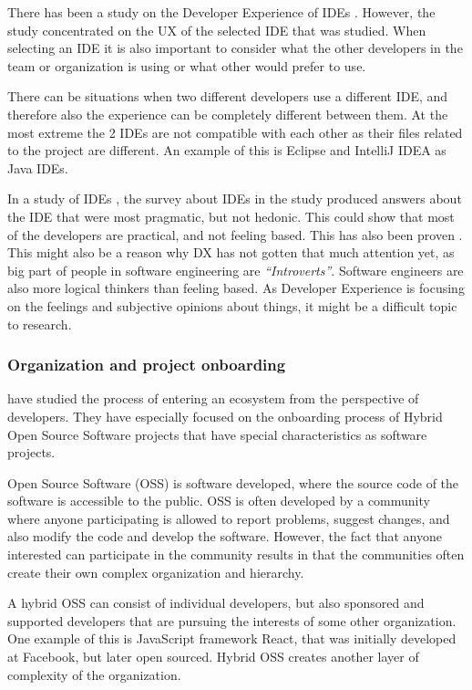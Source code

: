\documentclass[english, 12pt, a4paper, sci, utf8, a-1b, online]{aaltothesis}
\begin{document}
There has been a study on the Developer Experience of IDEs \parencite{software-developers-as-users}. However, the study concentrated on the UX of the selected IDE that was studied. When selecting an IDE it is also important to consider what the other developers in the team or organization is using or what other would prefer to use.

There can be situations when two different developers use a different IDE, and therefore also the experience can be completely different between them. At the most extreme the 2 IDEs are not compatible with each other as their files related to the project are different. An example of this is Eclipse and IntelliJ IDEA as Java IDEs.

In a study of IDEs \parencite{software-developers-as-users}, the survey about IDEs in the study produced answers about the IDE that were most pragmatic, but not hedonic. This could show that most of the developers are practical, and not feeling based. This has also been proven \parencite{personality-software}. This might also be a reason why DX has not gotten that much attention yet, as big part of people in software engineering are \textit{``Introverts''}. Software engineers are also more logical thinkers than feeling based. As Developer Experience is focusing on the feelings and subjective opinions about things, it might be a difficult topic to research.

\subsubsection{Organization and project onboarding}

\textcite{entering-an-ecosystem} have studied the process of entering an ecosystem from the perspective of developers. They have especially focused on the onboarding process of Hybrid Open Source Software projects that have special characteristics as software projects.

Open Source Software (OSS) is software developed, where the source code of the software is accessible to the public. OSS is often developed by a community where anyone participating is allowed to report problems, suggest changes, and also modify the code and develop the software. However, the fact that anyone interested can participate in the community results in that the communities often create their own complex organization and hierarchy.

A hybrid OSS can consist of individual developers, but also sponsored and supported developers that are pursuing the interests of some other organization. One example of this is JavaScript framework React, that was initially developed at Facebook, but later open sourced. Hybrid OSS creates another layer of complexity of the organization.
\end{document}
